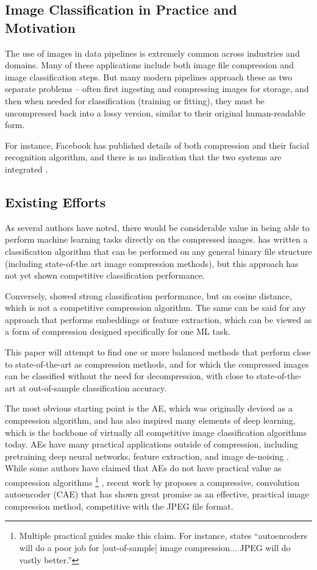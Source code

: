 \documentclass[twoside,11pt]{article}
\begin{document}
\subsection{Image Classification in Practice and Motivation}
The use of images in data pipelines is extremely common across industries and 
domains. Many of these applications include both image file compression and 
image classification steps. But many modern pipelines approach these as two 
separate problems – often first ingesting and compressing
images for storage, and then when needed for classification 
(training or fitting), they must be uncompressed back into a lossy version, 
similar to their original human-readable form.

 For instance, Facebook has published details of both compression and their 
facial recognition algorithm, and there is no indication that the two systems 
are integrated \citep{collet2016zstandard, taigman2014deepface}.

\subsection{Existing Efforts}

As several authors have noted, 
there would be considerable value in being able to perform machine learning 
tasks directly on the compressed images. \citet{needell2017} has written a classification 
algorithm that can be performed on any general binary file structure (including 
state-of-the art image compression methods), but this approach has not yet shown
 competitive classification performance. 

Conversely, \citet{fu2016} showed strong 
classification performance, but on cosine distance, which is not a competitive 
compression algorithm. The same can be said for any approach that performs 
embeddings or feature extraction, which can be viewed as a form of compression 
designed specifically for one ML task.

This paper will attempt to find one or more balanced methods that perform close 
to state-of-the-art as compression methods, and for which the compressed images 
can be classified without the need for decompression, with close to 
state-of-the-art at out-of-sample classification accuracy.

The most obvious starting point is the AE, which was originally 
devised as a compression algorithm, and has also inspired many elements of 
deep learning, which is the backbone of virtually all competitive image 
classification algorithms today.
AEs have many practical applications outside of compression, including 
pretraining deep neural networks, feature extraction, 
and image de-noising \citep{baldi2012autoencoders}. While some authors have claimed that AEs do 
not have practical value as compression algorithms
\footnote{
Multiple practical guides make this claim. For instance, \citet{huben2018_tds_ae} states ``autoencoders will 
do a poor job for [out-of-sample] image compression... JPEG will do vastly better.''
}
, recent work by 
\citet{theis2017} proposes a compressive, convolution autoencoder (CAE) that 
has shown great promise as an effective, practical image compression method, 
competitive with the JPEG file format.
\end{document}

